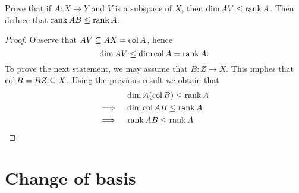 \documentclass{article}
\begin{document}
\setcounter{exercise}{3}
\begin{exercise}
  Prove that if $A:X\to Y$ and $V$ is a subspace of $X$, then
  $\dim AV\leq\operatorname{rank} A$. Then deduce that $\operatorname{rank} AB\leq\operatorname{rank} A$.
\end{exercise}
\begin{proof}
  Observe that $AV\subseteq AX=\operatorname{col} A$, hence
  \[\dim AV\leq \dim\operatorname{col} A=\operatorname{rank} A.\]
  To prove the next statement, we may assume that $B:Z\to X$.
  This implies that $\operatorname{col} B=BZ\subseteq X$.
  Using the previous result we obtain that
  \begin{align*}
    &\dim A(\operatorname{col} B)\leq\operatorname{rank} A\\\implies\quad
    &\dim\operatorname{col} AB\leq\operatorname{rank} A\\\implies\quad
    &\operatorname{rank} AB\leq\operatorname{rank} A
  \end{align*}
\end{proof}

\newpage
\section{Change of basis}
\setcounter{exercise}{2}
\end{document}
